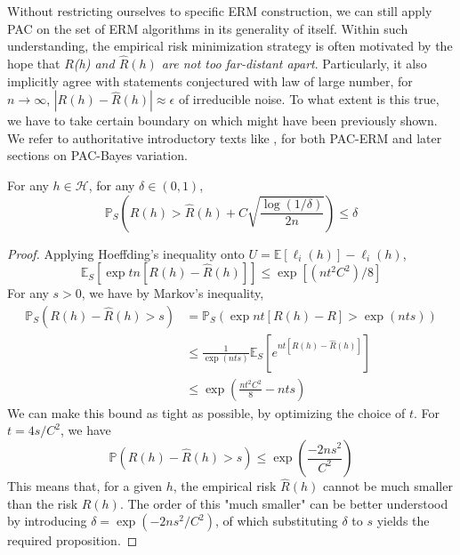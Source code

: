 \documentclass[
  journal=largetwo,
  year=2025,
  volume=37,
]{cup-journal}
\begin{document}
Without restricting ourselves to specific ERM construction, we can still apply PAC on the set of ERM algorithms in its generality of itself. Within such understanding, the empirical risk minimization strategy is often motivated by the hope that \textit{$R$(h) and $\hat{R}(h)$ are not too far-distant apart}. Particularly, it also implicitly agree with statements conjectured with law of large number, for $n\to\infty$, $|R(h)-\hat{R}(h)|\approx \epsilon$ of irreducible noise. To what extent is this true, we have to take certain boundary on which might have been previously shown. We refer to authoritative introductory texts like \cite{Alquier_2024}, for both PAC-ERM and later sections on PAC-Bayes variation. 

\begin{proposition}\label{prop:PAC_ERM_1}
    For any $h\in\mathcal{H}$, for any $\delta\in(0,1)$, 
    \begin{equation}
        \mathbb{P}_{S}\left( R(h) > \hat{R}(h)+ C\sqrt{\frac{\log{(1/\delta)}}{2n}}\right)\leq \delta
    \end{equation}
\end{proposition}
\begin{proof}
    Applying Hoeffding's inequality onto $U=\mathbb{E}[\ell_{i}(h)]-\ell_{i}(h)$, 
    \begin{equation}
        \mathbb{E}_{S}\left[\exp{tn[R(h)-\hat{R}(h)]}\right] \leq \exp{[(nt^2C^2)/8]}
    \end{equation}
    For any $s>0$, we have by Markov's inequality, 
    \begin{equation}
        \begin{split}
            \mathbb{P}_{S}(R(h)-\hat{R}(h)>s) 
            & = \mathbb{P}_{S} \left(\exp{nt[R(h)-R]}> \exp{(nts)}\right)\\
            & \leq \frac{1}{\exp{(nts)}} \mathbb{E}_{S}\left[e^{nt[R(h)-\hat{R}(h)]}\right]\\
            & \leq \exp{\left(\frac{nt^2C^2}{8}-nts\right)}
            \end{split}
    \end{equation}
    We can make this bound as tight as possible, by optimizing the choice of $t$. For $t=4s/C^{2}$, we have 
    \begin{equation}
        \mathbb{P}(R(h)-\hat{R}(h)>s) \leq \exp{\left(\frac{-2ns^2}{C^2}\right)}
    \end{equation}
    This means that, for a given $h$, the empirical risk $\hat{R}(h)$ cannot be much smaller than the risk $R(h)$. The order of this "much smaller" can be better understood by introducing $\delta=\exp{(-2ns^2/C^2)}$, of which substituting $\delta$ to $s$ yields the required proposition. 
\end{proof}
\end{document}
